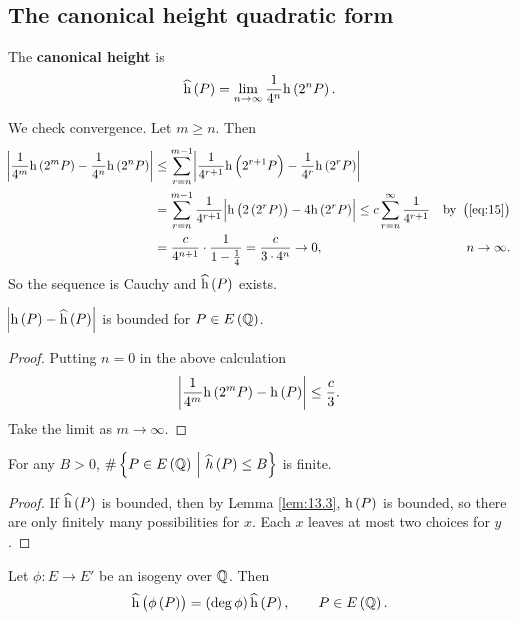 \subsection{The canonical height quadratic form}

\begin{definition*}
The \textbf{canonical height} is
$$ \widehat{\h}\br{P} = \lim_{n \to \infty} \dfrac{1}{4^n}\h\br{2^nP}. $$
\end{definition*}

We check convergence. Let $ m \ge n $. Then
\begin{align*}
\abs{\dfrac{1}{4^m}\h\br{2^mP} - \dfrac{1}{4^n}\h\br{2^nP}}
& \le \sum_{r = n}^{m - 1} \abs{\dfrac{1}{4^{r + 1}}\h\br{2^{r + 1}P} - \dfrac{1}{4^r}\h\br{2^rP}} \\
& = \sum_{r = n}^{m - 1} \dfrac{1}{4^{r + 1}}\abs{\h\br{2\br{2^rP}} - 4\h\br{2^rP}}
\le c\sum_{r = n}^\infty \dfrac{1}{4^{r + 1}} & \text{by} \ \br{\ref{eq:15}} \\
& = \dfrac{c}{4^{n + 1}} \cdot \dfrac{1}{1 - \tfrac{1}{4}}
= \dfrac{c}{3 \cdot 4^n}
\to 0, & n \to \infty.
\end{align*}
So the sequence is Cauchy and $ \widehat{\h}\br{P} $ exists.

\pagebreak

\begin{lemma}
\label{lem:13.3}
$ \abs{\h\br{P} - \widehat{\h}\br{P}} $ is bounded for $ P \in E\br{\QQ} $.
\end{lemma}

\begin{proof}
Putting $ n = 0 $ in the above calculation
$$ \abs{\dfrac{1}{4^m}\h\br{2^mP} - \h\br{P}} \le \dfrac{c}{3}. $$
Take the limit as $ m \to \infty $.
\end{proof}

\begin{corollary}
For any $ B > 0 $, $ \#\cbr{P \in E\br{\QQ} \st \widehat{h}\br{P} \le B} $ is finite.
\end{corollary}

\begin{proof}
If $ \widehat{\h}\br{P} $ is bounded, then by Lemma \ref{lem:13.3}, $ \h\br{P} $ is bounded, so there are only finitely many possibilities for $ x $. Each $ x $ leaves at most two choices for $ y $.
\end{proof}

\begin{lemma}
\label{lem:13.5}
Let $ \phi : E \to E' $ be an isogeny over $ \mathbb{Q} $. Then
$$ \widehat{\h}\br{\phi\br{P}} = \br{\deg \phi}\widehat{\h}\br{P}, \qquad P \in E\br{\QQ}. $$
\end{lemma}

